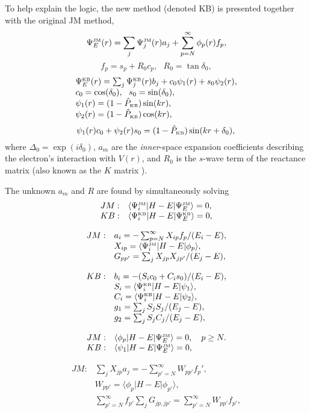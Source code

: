 \documentclass[aip
, pra
, showpacs
, aps
, twocolumn
, groupedaddress
, floatfix
]{revtex4}
\newcommand{\beq}{\begin{equation}}
\newcommand{\eeq}{\end{equation}}
\newcommand{\barr}{\begin{array}}
\newcommand{\earr}{\end{array}}
\newcommand{\JM}{\mbox{\tiny{JM}}}
\newcommand{\KB}{\mbox{\tiny{KB}}}
\begin{document}
To help explain the logic, the new method (denoted KB) is presented together with the original JM method,
\beq 
\Psi_E^{\JM}(r) =\sum_j \Psi_j^{\JM}(r)a_j  + \sum_{p=N}^{\infty} \phi_p(r) f_p, 
\eeq
\beq 
f_p = s_p + R_0 c_p, \ \ \ R_0 = \tan \delta_0,
\eeq
\beq \barr{l}
\Psi_E^{\KB}(r) =\sum_j \Psi_j^{\KB}(r) b_j  + c_0 \psi_1(r)  + s_0 \psi_2(r) ,\\
c_0 = \cos(\delta_0), \ \ s_0 = \sin(\delta_0),\\
\psi_1(r) = (1-\hat{P}_{\KB}) \sin(kr),\\
\psi_2(r) = (1-\hat{P}_{\KB}) \cos(kr),
\earr \eeq
\beq
\psi_1(r) c_0 + \psi_2(r) s_0 =
(1-\hat{P}_{\KB}) \sin(kr + \delta_0),\\
\eeq
where $\Delta_0 = \exp(i\delta_0)$, 
$a_m$ are the {\em inner}-space expansion coefficients describing  the electron's interaction with  $V(r)$, and
$R_0$ is the $s$-wave term of the reactance matrix (also known as the $K$ matrix \cite{Taylor72}).


The unknown $a_m$ and $R$ are found by simultaneously solving
\beq \barr{rl}
JM: & \langle\Psi_i^{\JM}|H-E|\Psi_E^{\JM}\rangle= 0, \\
KB: & \langle\Psi_i^{\KB}|H-E|\Psi_E^{\KB}\rangle=0 ,
\earr \eeq

\beq \barr{rl}
JM: & a_i = - \sum_{p=N}^{\infty} X_{ip} f_p / (E_i-E),\\
& X_{ip}=  \langle\Psi_i^{\JM}|H-E| \phi_p \rangle ,\\
& G_{pp'}= \sum_j X_{jp} X_{jp'}/(E_j-E),
\earr \eeq

\beq \barr{rl}
KB: & b_i = - (S_i c_0 + C_i s_0) / (E_i-E), \\
& S_i = \langle\Psi_i^{\KB}|H-E|  \psi_1 \rangle ,\\
& C_i = \langle\Psi_i^{\KB}|H-E|  \psi_2 \rangle ,\\
& g_1= \sum_j S_{j} S_{j}/(E_j-E),\\
& g_2= \sum_j S_{j} C_{j}/(E_j-E),
\earr \eeq

\beq \barr{rl}
JM: & \langle\phi_p|H-E|\Psi_E^{\JM}\rangle=0 , \ \ \ p \geq N.\\
KB: & \langle \psi_1 |H-E|\Psi_E^{\JM}\rangle=0,
\earr \eeq

\beq \barr{rl}
JM: & \sum_j X_{jp} a_j = - \sum_{p'=N}^{\infty} W_{pp'} f_p',\\
& W_{pp'}  = \langle \phi_p | H-E | \phi_{p'} \rangle,\\
& \sum_{p'=N}^{\infty} f_{p'}  \sum_j G_{jp,jp'} = \sum_{p'=N}^{\infty} W_{pp'} f_{p'},\\
\earr \eeq
\end{document}
